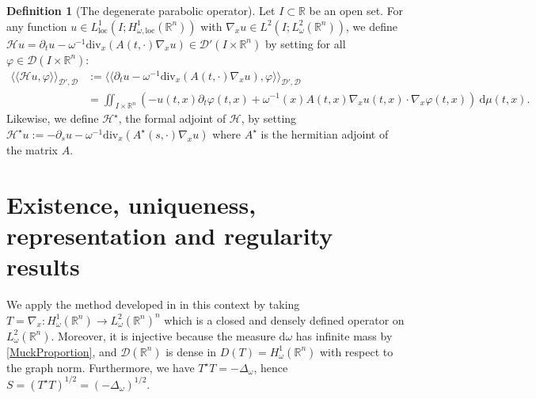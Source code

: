 \documentclass[12pt, letterpaper]{amsart}
\theoremstyle{definition}
\newtheorem{defn}[thm]{Definition}
\theoremstyle{remark}
\newcommand{\llangle}{\langle\!\langle}
\newcommand{\rrangle}{\rangle\!\rangle}
\numberwithin{equation}{section}
\begin{document}
\begin{defn}[The degenerate parabolic operator]\label{def:duality}
    Let $I\subset \mathbb{R}$ be an open set. For any function $u \in L^1_{\mathrm{loc}}(I;H^1_{\omega,\mathrm{loc}}(\mathbb{R}^n))$ with $\nabla_x u \in L^2(I; L^2_\omega(\mathbb{R}^n))$, we define $\mathcal{H}u=\partial_t u -\omega^{-1} \mathrm{div}_x(A(t,\cdot)\nabla_x u)\in \mathcal{D}'(I \times \mathbb{R}^n)$ by setting for all $\varphi \in  \mathcal{D}(I \times \mathbb{R}^n)$:  
    \begin{align*}
       \llangle \mathcal{H}u, \varphi \rrangle_{\mathcal{D}',\mathcal{D}} &:= \llangle \partial_t u -\omega^{-1} \mathrm{div}_x(A(t,\cdot)\nabla_x u), \varphi \rrangle_{\mathcal{D}',\mathcal{D}}
        \\& = \iint_{I\times \mathbb{R}^n} \left ( -u(t,x)  \partial_t \varphi(t,x) +\omega^{-1}(x) A(t,x)\nabla_x u(t,x) \cdot \nabla_x \varphi(t,x)  \right ) \ \mathrm{d}\mu(t,x).
    \end{align*}
    Likewise, we define $\mathcal{H}^\star$, the formal adjoint of $\mathcal{H}$, by setting $\mathcal{H}^\star u:= - \partial_s u - \omega^{-1} \mathrm{div}_x(A^\star (s,\cdot)\nabla_x u)$ where $A^\star$ is the hermitian adjoint of the matrix $A$.
\end{defn}




\section{Existence, uniqueness, representation and regularity results}\label{section 3}

We apply the method developed in \cite{auscher2024fundamental} in this context by taking $T=\nabla_x:H^1_\omega(\mathbb{R}^n) \to L^2_\omega(\mathbb{R}^n)^n$ which is a closed and densely defined operator on $L^2_\omega(\mathbb{R}^n)$. Moreover, it is injective because the measure $\mathrm{d}\omega$ has infinite mass by \eqref{MuckProportion}, and $\mathcal{D}(\mathbb{R}^n)$ is dense in $D(T) = H^1_\omega(\mathbb{R}^n)$ with respect to the graph norm. Furthermore, we have $T^\star T = -\Delta_\omega$, hence $S=(T^\star T)^{1/2} = (-\Delta_\omega)^{1/2}$.
\end{document}
